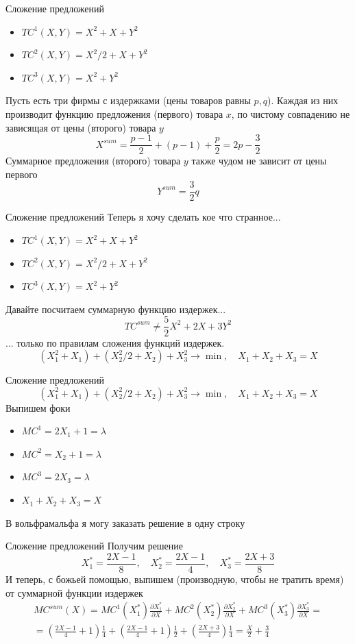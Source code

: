 \documentclass{beamer}
\begin{document}
\begin{frame}{Сложение предложений}
\begin{itemize}
  \item $TC^1(X,Y) = X^2 + X + Y^2$
  \item $TC^2(X,Y) = X^2/2 + X + Y^2$
  \item $TC^3(X,Y) = X^2 + Y^2$
\end{itemize}
Пусть есть три фирмы с издержками (цены товаров равны $p,q$). Каждая из них производит функцию предложения (первого) товара $x$, по чистому совпадению не зависящая от цены (второго) товара $y$
$$ X^{sum} = \frac{p-1}{2} + (p-1) + \frac{p}{2} = 2p - \frac{3}{2}$$
Суммарное предложения (второго) товара $y$ также чудом не зависит от цены первого
$$ Y^{sum} = \frac{3}{2} q $$ 
\end{frame}

\begin{frame}{Сложение предложений}
Теперь я хочу сделать кое что странное...
\begin{itemize}
  \item $TC^1(X,Y) = X^2 + X + Y^2$
  \item $TC^2(X,Y) = X^2/2 + X + Y^2$
  \item $TC^3(X,Y) = X^2 + Y^2$
\end{itemize}
Давайте посчитаем суммарную функцию издержек...
$$ TC^{sum} \neq \frac{5}{2} X^2 + 2X + 3 Y^2$$
... только по правилам сложения функций издержек.
$$ (X_1^2 + X_1) + (X_2^2/2 + X_2) + X^2_3 \to \min, \quad X_1 + X_2 + X_3 = X$$
\end{frame}

\begin{frame}{Сложение предложений}
$$ (X_1^2 + X_1) + (X_2^2/2 + X_2) + X^2_3 \to \min, \quad X_1 + X_2 + X_3 = X$$
Выпишем фоки
\begin{itemize}
  \item $MC^1 = 2 X_1 + 1 = \lambda$
  \item $MC^2 = X_2 + 1 = \lambda$
  \item $MC^3 = 2 X_3 = \lambda$
  \item $X_1 + X_2 + X_3 = X$
\end{itemize}
В вольфрамальфа я могу заказать решение в одну строку 

\end{frame}

\begin{frame}{Сложение предложений}
Получим решение
$$X^{\ast}_1 = \frac{2X - 1}{8}, \quad X^{\ast}_2 = \frac{2X - 1}{4}, \quad X^{\ast}_3 = \frac{2X + 3}{8}$$
И теперь, с божьей помощью, выпишем (производную, чтобы не тратить время) от суммарной функции издержек
\begin{gather*}MC^{sum}(X) = MC^1(X^{\ast}_1)\frac{\partial X^{\ast}_1}{\partial X} + MC^2(X^{\ast}_2)\frac{\partial X^{\ast}_2}{\partial X} + MC^3(X^{\ast}_3)\frac{\partial X^{\ast}_3}{\partial X} = \\ = (\frac{2X - 1}{4} + 1)\frac{1}{4} + (\frac{2X-1}{4} + 1)\frac{1}{2} + (\frac{2X+3}{4})\frac{1}{4} = \frac{X}{2} + \frac{3}{4}\end{gather*}
\end{frame}
\end{document}

